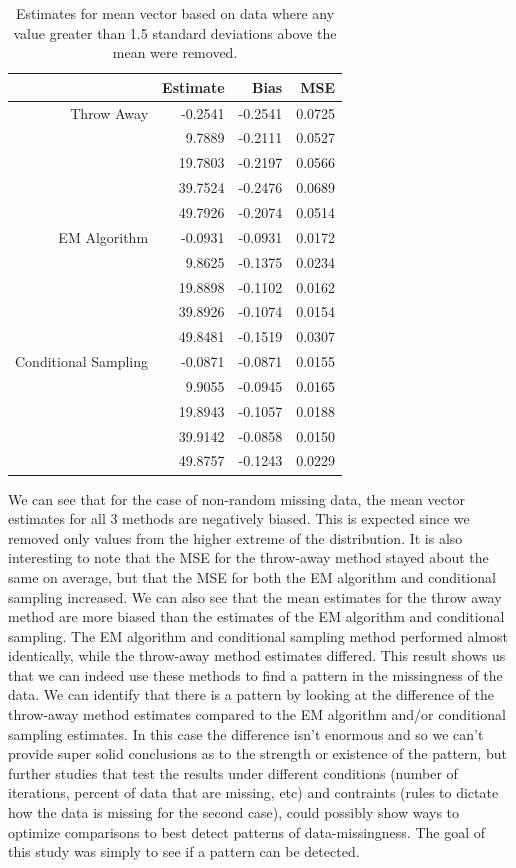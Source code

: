 \documentclass{svproc}
\begin{document}
\begin{table}[!!!!h]

\centering
\begin{tabular}{rrrr}
  \hline
 & Estimate & Bias & MSE \\ 
  \hline
  Throw Away & -0.2541 & -0.2541 & 0.0725 \\ 
   & 9.7889 & -0.2111 & 0.0527 \\ 
   & 19.7803 & -0.2197 & 0.0566 \\ 
   & 39.7524 & -0.2476 & 0.0689 \\ 
   & 49.7926 & -0.2074 & 0.0514 \\ \hline
  EM Algorithm & -0.0931 & -0.0931 & 0.0172 \\ 
   & 9.8625 & -0.1375 & 0.0234 \\ 
   & 19.8898 & -0.1102 & 0.0162 \\ 
   & 39.8926 & -0.1074 & 0.0154 \\ 
   & 49.8481 & -0.1519 & 0.0307 \\ \hline
  Conditional Sampling & -0.0871 & -0.0871 & 0.0155 \\ 
   & 9.9055 & -0.0945 & 0.0165 \\ 
   & 19.8943 & -0.1057 & 0.0188 \\ 
   & 39.9142 & -0.0858 & 0.0150 \\ 
   & 49.8757 & -0.1243 & 0.0229 \\ 
   \hline
\end{tabular}
\caption{Estimates for mean vector based on data where any value greater than 1.5 standard deviations above the mean were removed.}
\label{tab2}
\end{table}

We can see that for the case of non-random missing data, the mean vector estimates for all 3 methods are negatively biased. This is expected since we removed only values from the higher extreme of the distribution. It is also interesting to note that the MSE for the throw-away method stayed about the same on average, but that the MSE for both the EM algorithm and conditional sampling increased. We can also see that the mean estimates for the throw away method are more biased than the estimates of the EM algorithm and conditional sampling. The EM algorithm and conditional sampling method performed almost identically, while the throw-away method estimates differed. This result shows us that we can indeed use these methods to find a pattern in the missingness of the data. We can identify that there is a pattern by looking at the difference of the throw-away method estimates compared to the EM algorithm and/or conditional sampling estimates. In this case the difference isn't enormous and so we can't provide super solid conclusions as to the strength or existence of the pattern, but further studies that test the results under different conditions (number of iterations, percent of data that are missing, etc) and contraints (rules to dictate how the data is missing for the second case), could possibly show ways to optimize comparisons to best detect patterns of data-missingness. The goal of this study was simply to see if a pattern can be detected. 
\end{document}
